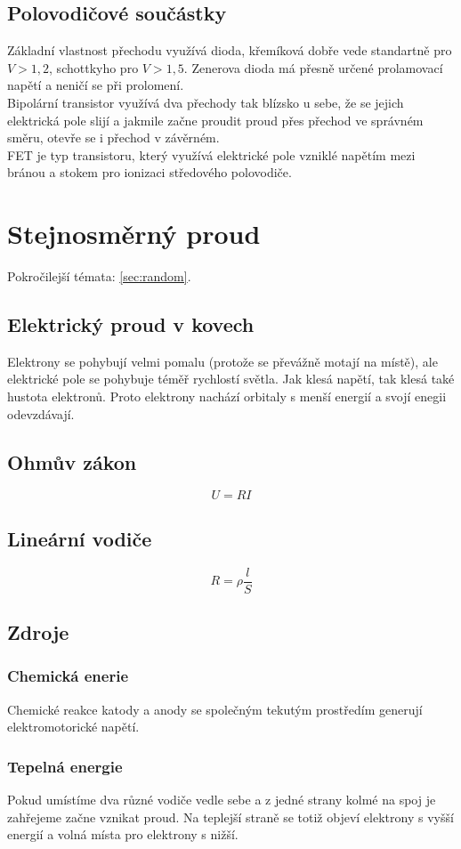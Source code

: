 \documentclass[titlepage]{report}
\begin{document}
\section{Polovodičové součástky}
Základní vlastnost přechodu využívá dioda, křemíková dobře vede standartně pro $V > 1,2$, schottkyho pro $V > 1,5$. Zenerova dioda má přesně určené prolamovací napětí a neničí se při prolomení.\\
Bipolární transistor využívá dva přechody tak blízsko u sebe, že se jejich elektrická pole slijí a jakmile začne proudit proud přes přechod ve správném směru, otevře se i přechod v závěrném.\\
FET je typ transistoru, který využívá elektrické pole vzniklé napětím mezi bránou a stokem pro ionizaci středového polovodiče.
\chapter{Stejnosměrný proud}
Pokročilejší témata: \ref{sec:random}.
\section{Elektrický proud v kovech}
Elektrony se pohybují velmi pomalu (protože se převážně motají na místě), ale elektrické pole se pohybuje téměř rychlostí světla. Jak klesá napětí, tak klesá také hustota elektronů. Proto elektrony nachází orbitaly s menší energií a svojí enegii odevzdávají.
\section{Ohmův zákon}
\begin{equation}
U = RI
\end{equation}
\section{Lineární vodiče}
\begin{equation}
R = \rho \frac{l}{S}
\end{equation}
\section{Zdroje}
\subsection{Chemická enerie}
Chemické reakce katody a anody se společným tekutým prostředím generují elektromotorické napětí.
\subsection{Tepelná energie}
Pokud umístíme dva různé vodiče vedle sebe a z jedné strany kolmé na spoj je zahřejeme začne vznikat proud. Na teplejší straně se totiž objeví elektrony s vyšší energií a volná místa pro elektrony s nižší.
\end{document}
